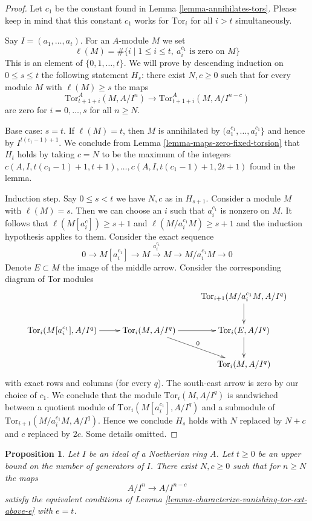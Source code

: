 \documentclass{stacks-project}
\theoremstyle{plain}
\newtheorem{proposition}[subsection]{Proposition}
\theoremstyle{definition}
\theoremstyle{remark}
\numberwithin{equation}{subsection}
\begin{document}
\begin{proof}
Let $c_1$ be the constant found in Lemma \ref{lemma-annihilates-tors}.
Please keep in mind that this constant $c_1$ works for $\text{Tor}_i$ for all
$i > t$ simultaneously.

\medskip\noindent
Say $I = (a_1, \ldots, a_t)$. For an $A$-module $M$ we set
$$
\ell(M) =
\#\{i \mid 1 \leq i \leq t,\ a_i^{c_1}\text{ is zero on }M\}
$$
This is an element of $\{0, 1, \ldots, t\}$.
We will prove by descending induction on $0 \leq s \leq t$
the following statement $H_s$: there exist $N, c \geq 0$ such that
for every module $M$ with $\ell(M) \geq s$ the maps
$$
\text{Tor}_{t + 1 + i}^A(M, A/I^n) \to \text{Tor}_{t + 1 + i}^A(M, A/I^{n - c})
$$
are zero for $i = 0, \ldots, s$ for all $n \geq N$.

\medskip\noindent
Base case: $s = t$. If $\ell(M) = t$, then $M$ is annihilated by
$(a_1^{c_1}, \ldots, a_t^{c_1}\}$ and hence by
$I^{t(c_1 - 1) + 1}$. We conclude from
Lemma \ref{lemma-maps-zero-fixed-torsion}
that $H_t$ holds by taking $c = N$ to be the maximum of the integers
$c(A, I, t(c_1 - 1) + 1, t + 1), \ldots, c(A, I, t(c_1 - 1) + 1, 2t + 1)$
found in the lemma.

\medskip\noindent
Induction step. Say $0 \leq s < t$ we have $N, c$ as in $H_{s + 1}$.
Consider a module $M$ with $\ell(M) = s$. Then we can choose an $i$
such that $a_i^{c_1}$ is nonzero on $M$. It follows that
$\ell(M[a_i^c]) \geq s + 1$ and $\ell(M/a_i^{c_1}M) \geq s + 1$
and the induction hypothesis applies to them.
Consider the exact sequence
$$
0 \to M[a_i^{c_1}] \to M \xrightarrow{a_i^{c_1}} M \to M/a_i^{c_1}M \to 0
$$
Denote $E \subset M$ the image of the middle arrow.
Consider the corresponding diagram of Tor modules
$$
\xymatrix{
&
&
\text{Tor}_{i + 1}(M/a_i^{c_1}M, A/I^q) \ar[d] \\
\text{Tor}_i(M[a_i^{c_1}], A/I^q) \ar[r] &
\text{Tor}_i(M, A/I^q) \ar[r] \ar[rd]^0 &
\text{Tor}_i(E, A/I^q) \ar[d] \\
&
&
\text{Tor}_i(M, A/I^q)
}
$$
with exact rows and columns (for every $q$). The south-east arrow
is zero by our choice of $c_1$. We conclude that the
module $\text{Tor}_i(M, A/I^q)$ is sandwiched between
a quotient module of $\text{Tor}_i(M[a_i^{c_1}], A/I^q)$
and a submodule of $\text{Tor}_{i + 1}(M/a_i^{c_1}M, A/I^q)$.
Hence we conclude $H_s$ holds with $N$ replaced by $N + c$
and $c$ replaced by $2c$. Some details omitted.
\end{proof}

\begin{proposition}
\label{proposition-uniform-artin-rees}
Let $I$ be an ideal of a Noetherian ring $A$. Let $t \geq 0$
be an upper bound on the number of generators of $I$.
There exist $N, c \geq 0$ such that for $n \geq N$ the maps
$$
A/I^n \to A/I^{n - c}
$$
satisfy the equivalent conditions of
Lemma \ref{lemma-characterize-vanishing-tor-ext-above-e} with $e = t$.
\end{proposition}
\end{document}
